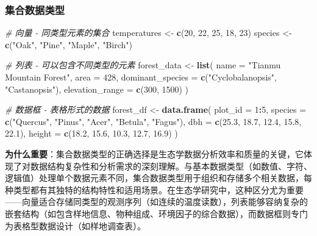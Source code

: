 \documentclass[
  twoside]{book}
\newenvironment{Shaded}{\begin{snugshade}}{\end{snugshade}}
\newcommand{\AttributeTok}[1]{\textcolor[rgb]{0.13,0.29,0.53}{#1}}
\newcommand{\CommentTok}[1]{\textcolor[rgb]{0.56,0.35,0.01}{\textit{#1}}}
\newcommand{\DecValTok}[1]{\textcolor[rgb]{0.00,0.00,0.81}{#1}}
\newcommand{\FloatTok}[1]{\textcolor[rgb]{0.00,0.00,0.81}{#1}}
\newcommand{\FunctionTok}[1]{\textcolor[rgb]{0.13,0.29,0.53}{\textbf{#1}}}
\newcommand{\NormalTok}[1]{#1}
\newcommand{\OtherTok}[1]{\textcolor[rgb]{0.56,0.35,0.01}{#1}}
\newcommand{\SpecialCharTok}[1]{\textcolor[rgb]{0.81,0.36,0.00}{\textbf{#1}}}
\newcommand{\StringTok}[1]{\textcolor[rgb]{0.31,0.60,0.02}{#1}}
\begin{document}
\hypertarget{ux96c6ux5408ux6570ux636eux7c7bux578b}{%
\subsubsection{集合数据类型}\label{ux96c6ux5408ux6570ux636eux7c7bux578b}}

\begin{Shaded}
\begin{Highlighting}[]
\CommentTok{\# 向量 {-} 同类型元素的集合}
\NormalTok{temperatures }\OtherTok{\textless{}{-}} \FunctionTok{c}\NormalTok{(}\DecValTok{20}\NormalTok{, }\DecValTok{22}\NormalTok{, }\DecValTok{25}\NormalTok{, }\DecValTok{18}\NormalTok{, }\DecValTok{23}\NormalTok{)}
\NormalTok{species }\OtherTok{\textless{}{-}} \FunctionTok{c}\NormalTok{(}\StringTok{"Oak"}\NormalTok{, }\StringTok{"Pine"}\NormalTok{, }\StringTok{"Maple"}\NormalTok{, }\StringTok{"Birch"}\NormalTok{)}

\CommentTok{\# 列表 {-} 可以包含不同类型的元素}
\NormalTok{forest\_data }\OtherTok{\textless{}{-}} \FunctionTok{list}\NormalTok{(}
  \AttributeTok{name =} \StringTok{"Tianmu Mountain Forest"}\NormalTok{,}
  \AttributeTok{area =} \DecValTok{428}\NormalTok{,}
  \AttributeTok{dominant\_species =} \FunctionTok{c}\NormalTok{(}\StringTok{"Cyclobalanopsis"}\NormalTok{, }\StringTok{"Castanopsis"}\NormalTok{),}
  \AttributeTok{elevation\_range =} \FunctionTok{c}\NormalTok{(}\DecValTok{300}\NormalTok{, }\DecValTok{1500}\NormalTok{)}
\NormalTok{)}

\CommentTok{\# 数据框 {-} 表格形式的数据}
\NormalTok{forest\_df }\OtherTok{\textless{}{-}} \FunctionTok{data.frame}\NormalTok{(}
  \AttributeTok{plot\_id =} \DecValTok{1}\SpecialCharTok{:}\DecValTok{5}\NormalTok{,}
  \AttributeTok{species =} \FunctionTok{c}\NormalTok{(}\StringTok{"Quercus"}\NormalTok{, }\StringTok{"Pinus"}\NormalTok{, }\StringTok{"Acer"}\NormalTok{, }\StringTok{"Betula"}\NormalTok{, }\StringTok{"Fagus"}\NormalTok{),}
  \AttributeTok{dbh =} \FunctionTok{c}\NormalTok{(}\FloatTok{25.3}\NormalTok{, }\FloatTok{18.7}\NormalTok{, }\FloatTok{12.4}\NormalTok{, }\FloatTok{15.8}\NormalTok{, }\FloatTok{22.1}\NormalTok{),}
  \AttributeTok{height =} \FunctionTok{c}\NormalTok{(}\FloatTok{18.2}\NormalTok{, }\FloatTok{15.6}\NormalTok{, }\FloatTok{10.3}\NormalTok{, }\FloatTok{12.7}\NormalTok{, }\FloatTok{16.9}\NormalTok{)}
\NormalTok{)}
\end{Highlighting}
\end{Shaded}

\textbf{为什么重要}：集合数据类型的正确选择是生态学数据分析效率和质量的关键，它体现了对数据结构复杂性和分析需求的深刻理解。与基本数据类型（如数值、字符、逻辑值）处理单个数据元素不同，集合数据类型用于组织和存储多个相关数据，每种类型都有其独特的结构特性和适用场景。在生态学研究中，这种区分尤为重要------向量适合存储同类型的观测序列（如连续的温度读数），列表能够容纳复杂的嵌套结构（如包含样地信息、物种组成、环境因子的综合数据），而数据框则专门为表格型数据设计（如样地调查表）。
\end{document}
